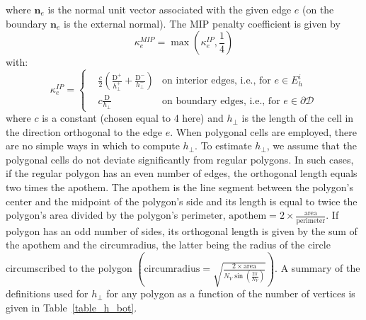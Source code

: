 \documentclass[preprint,10pt]{elsarticle}
\newcommand\grad{\boldsymbol{\nabla}}
\newcommand\bo{\boldsymbol{\Omega}}
\newcommand\bs{\boldsymbol}
\newcommand\mc{\mathcal}
\renewcommand{\(}{\left(}
\renewcommand{\)}{\right)}
\renewcommand{\[}{\left[}
\renewcommand{\]}{\right]}
\newcommand\vn{\bs{n}}
\begin{document}
%
where $\vn_e$ is the normal unit vector associated with the given edge $e$
(on the boundary $\vn_e$ is the external normal).
%
The MIP penalty coefficient is given by
%
\begin{equation}
\kappa_e^{MIP} = \max\(\kappa_e^{IP},\frac{1}{4}\)
\end{equation}
with:
\begin{equation}
\kappa_e^{IP} = \left\{
\begin{aligned}
&\frac{c}{2} \left( \frac{\mathrm{D^+}}{h_{\bot}^+} + \frac{\mathrm{D}^-}{h_{\bot}^-} \right) & \textrm{on interior edges, i.e., for }
e\in E_h^i\\
&c \frac{\mathrm{D}}{h_{\bot}} & \textrm{on boundary edges, i.e., for } e
\in\partial \mc{D} %
\end{aligned}
\right. 
\end{equation}
%
where $c$ is a constant (chosen equal to 4 here) and $h_{\bot}$ is the length of the cell in the direction
orthogonal to the edge $e$. 
%
%
When polygonal cells are employed, there are no 
simple ways in which to compute $h_{\bot}$. To estimate $h_{\bot}$, we 
assume that the polygonal cells do not deviate significantly from regular polygons. 
In such cases, if the regular polygon has an even number of edges, the orthogonal 
length equals two times the apothem. The apothem is the line segment between the 
polygon's center and the midpoint of the polygon's side and its length is equal to
twice the polygon's area divided by the polygon's perimeter,
$\textrm{apothem}=2\times \tfrac{\textrm{area}}{\textrm{perimeter}}$. 
If polygon has an odd number of sides, its orthogonal length is given by the sum of the
apothem and the circumradius, the latter being the radius of the circle circumscribed to 
the polygon $\(\textrm{circumradius}=\sqrt{\tfrac{2\times \textrm{area}}{N_V
\sin\(\frac{2\pi}{N_V}\)}}\)$. A summary of the definitions used for $h_{\bot}$ for 
any polygon as a function of the number of vertices is given in
Table~\ref {table_h_bot}.
%
\end{document}
